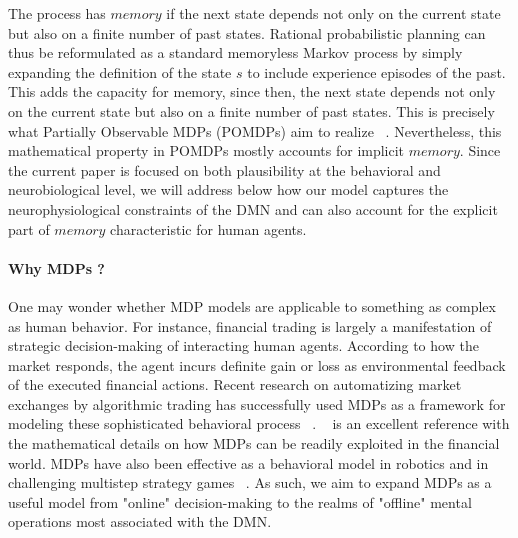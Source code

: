 \documentclass[10pt,letterpaper]{article}
\begin{document}
The process has $memory$ if the next state depends not only on the current state but also on a finite number of past states. Rational probabilistic planning can thus be reformulated as a standard memoryless Markov process by simply expanding the definition of the state $s$ to include experience episodes of the past. This adds the capacity for memory, since then, the next state depends not only on the current state but also on a finite number of past states. This is precisely what Partially Observable MDPs (POMDPs) aim to realize ~\citep{starkweather2017dopamine,o2006making}.
Nevertheless, this mathematical property in POMDPs mostly accounts for implicit $memory$. Since the current paper is focused on both plausibility at the behavioral and neurobiological level, we will address below how our model captures the neurophysiological constraints of the DMN and can also account for the explicit part of $memory$ characteristic for human agents.

\paragraph*{Why MDPs ?} One may wonder whether MDP models are applicable to something as complex as human behavior. For instance, financial trading is largely a manifestation of strategic decision-making of interacting human agents. According to how the market responds, the agent incurs definite gain or loss as environmental feedback of the executed financial actions. Recent research on automatizing market exchanges by algorithmic trading has successfully used MDPs as a framework for modeling these sophisticated behavioral process  ~\citep{brazdil2017,yang15,yang14,yang12,dempster2006,hult2010}. ~\citep{abergel2017} is an excellent reference with the mathematical details on how MDPs can be readily exploited in the financial world.
%
MDPs have also been effective as a behavioral model in robotics \citep{ng2004,abbeel2004} and in challenging multistep strategy games ~\citep{mnih2015,silver2016mastering,pritzel2017neural}.
%
As such, we aim to expand MDPs as a useful model from "online" decision-making to the realms of "offline" mental operations most associated with the DMN.


\end{document}
